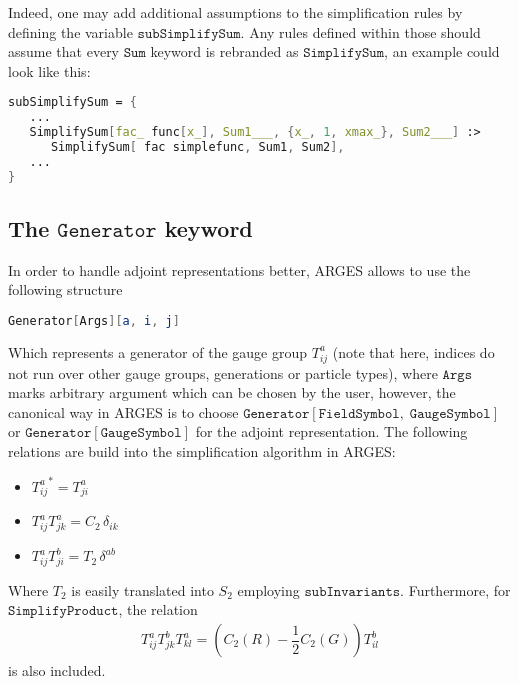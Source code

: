\documentclass{scrartcl}
\begin{document}
Indeed, one may add additional assumptions to the simplification rules by defining the variable $\mathtt{subSimplifySum}$. Any rules defined within those should assume that every $\mathtt{Sum}$ keyword is rebranded as $\mathtt{SimplifySum}$, an example could look like this:
\begin{lstlisting}[language=mathematica,mathescape,columns=flexible,backgroundcolor=\color{light-gray}]
subSimplifySum = {
   ...
   SimplifySum[fac_ func[x_], Sum1___, {x_, 1, xmax_}, Sum2___] :> 
      SimplifySum[ fac simplefunc, Sum1, Sum2],
   ...
}
\end{lstlisting}
\subsection{The $\mathtt{Generator}$ keyword}
In order to handle adjoint representations better, ARGES allows to use the following structure
\begin{lstlisting}[language=mathematica,mathescape,columns=flexible,backgroundcolor=\color{light-gray}]
Generator[Args][a, i, j]
\end{lstlisting}
Which represents a generator of the gauge group $T^a_{ij}$ (note that here, indices do not run over other gauge groups, generations or particle types), where $\mathtt{Args}$ marks arbitrary argument which can be chosen by the user, however, the canonical way in ARGES is to choose $\mathtt{Generator}[\mathtt{FieldSymbol},\;\mathtt{GaugeSymbol}]$ or $\mathtt{Generator}[\mathtt{GaugeSymbol}]$ for the adjoint representation.
The following relations are build into the simplification algorithm in ARGES:
\begin{itemize}
\item ${T^a_{ij}}^* = T^a_{ji}$
\item $T^a_{ij} T^a_{jk} = C_2\, \delta_{ik}$
\item $T^a_{ij} T^b_{ji} = T_2\, \delta^{ab}$
\end{itemize}
Where $T_2$ is easily translated into $S_2$ employing $\mathtt{subInvariants}$. Furthermore, for $\mathtt{SimplifyProduct}$, the relation
\begin{align*}
T^a_{ij} T^b_{jk} T^a_{kl} = \left(C_2(R) - \dfrac{1}{2} C_2(G)\right) T^b_{il}
\end{align*}
is also included.
\newpage
\end{document}
